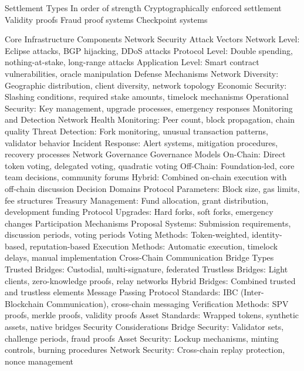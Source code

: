 \documentclass[
  letterpaper,
  DIV=11,
  numbers=noendperiod]{scrreprt}
\begin{document}
Settlement Types In order of strength Cryptographically enforced
settlement Validity proofs Fraud proof systems Checkpoint systems

Core Infrastructure Components Network Security Attack Vectors Network
Level: Eclipse attacks, BGP hijacking, DDoS attacks Protocol Level:
Double spending, nothing-at-stake, long-range attacks Application Level:
Smart contract vulnerabilities, oracle manipulation Defense Mechanisms
Network Diversity: Geographic distribution, client diversity, network
topology Economic Security: Slashing conditions, required stake amounts,
timelock mechanisms Operational Security: Key management, upgrade
processes, emergency responses Monitoring and Detection Network Health
Monitoring: Peer count, block propagation, chain quality Threat
Detection: Fork monitoring, unusual transaction patterns, validator
behavior Incident Response: Alert systems, mitigation procedures,
recovery processes Network Governance Governance Models On-Chain: Direct
token voting, delegated voting, quadratic voting Off-Chain:
Foundation-led, core team decisions, community forums Hybrid: Combined
on-chain execution with off-chain discussion Decision Domains Protocol
Parameters: Block size, gas limits, fee structures Treasury Management:
Fund allocation, grant distribution, development funding Protocol
Upgrades: Hard forks, soft forks, emergency changes Participation
Mechanisms Proposal Systems: Submission requirements, discussion
periods, voting periods Voting Methods: Token-weighted, identity-based,
reputation-based Execution Methods: Automatic execution, timelock
delays, manual implementation Cross-Chain Communication Bridge Types
Trusted Bridges: Custodial, multi-signature, federated Trustless
Bridges: Light clients, zero-knowledge proofs, relay networks Hybrid
Bridges: Combined trusted and trustless elements Message Passing
Protocol Standards: IBC (Inter-Blockchain Communication), cross-chain
messaging Verification Methods: SPV proofs, merkle proofs, validity
proofs Asset Standards: Wrapped tokens, synthetic assets, native bridges
Security Considerations Bridge Security: Validator sets, challenge
periods, fraud proofs Asset Security: Lockup mechanisms, minting
controls, burning procedures Network Security: Cross-chain replay
protection, nonce management
\end{document}
